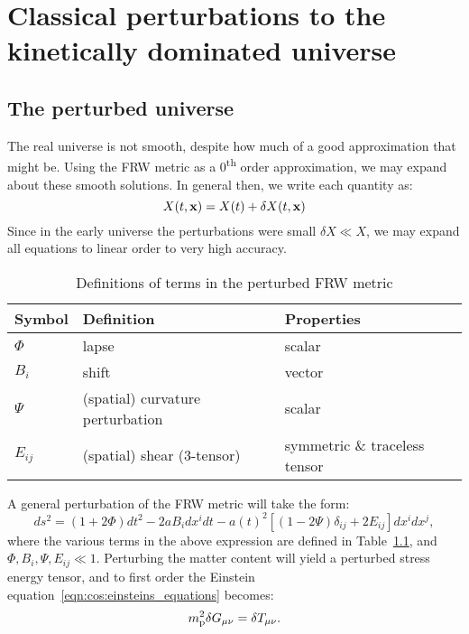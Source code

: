 \chapter{Classical perturbations to the kinetically dominated universe}
\label{chap:cls}

\section{The perturbed universe}
The real universe is not smooth, despite how much of a good approximation that might be. Using the FRW metric as a 0\textsuperscript{th} order approximation, we may expand about these smooth solutions. In general then, we write each quantity as:
\begin{equation}
  X(t,\mathbf{x}) = X(t) + \delta X(t,\mathbf{x})
  \label{eqn:cos:expansion}
\end{equation}
Since in the early universe the perturbations were small $\delta X \ll X$, we may expand all equations to linear order to very high accuracy.

\begin{table}
  \centering
\begin{tabular}{lll}
 \toprule
  Symbol & Definition & Properties \\
 \midrule
 \midrule
 $\Phi$ & lapse & scalar\\
 $B_i$ & shift & vector\\
 $\Psi$ & (spatial) curvature perturbation  & scalar\\
 $E_{ij}$ & (spatial) shear (3-tensor) & symmetric \& traceless tensor\\
 \bottomrule
\end{tabular}
\caption{Definitions of terms in the perturbed FRW metric}\label{tab:cos:perturbed_metric}
\end{table}


A general perturbation of the FRW metric will take the form:
\begin{equation}
  ds^2 = (1+2\Phi)dt^2 -2a B_i dx^i dt  -a{(t)}^2 \left[ \left( 1 - 2 \Psi \right)\delta_{ij} + 2E_{ij} \right] dx^i dx^j,
  \label{eqn:cos:FRW_perturb}
\end{equation}
where the various terms in the above expression are defined in Table~\ref{tab:cos:perturbed_metric}, and $\Phi,B_i,\Psi,E_{ij}\ll1$. Perturbing the matter content will yield a perturbed stress energy tensor, and to first order the Einstein equation~\eqref{eqn:cos:einsteins_equations} becomes:
\begin{equation}
 m_{\mathrm{p}}^2 \delta G_{\mu\nu} = \delta T_{\mu\nu}.
  \label{eqn:cos:einsteins_equations_perturb}
\end{equation}



